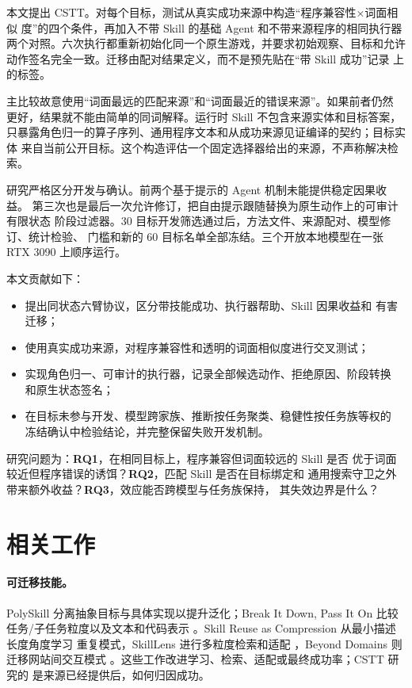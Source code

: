 \documentclass[10pt]{article}
\begin{document}
本文提出 CSTT。对每个目标，测试从真实成功来源中构造“程序兼容性×词面相似
度”的四个条件，再加入不带 Skill 的基础 Agent 和不带来源程序的相同执行器
两个对照。六次执行都重新初始化同一个原生游戏，并要求初始观察、目标和允许
动作签名完全一致。迁移由配对结果定义，而不是预先贴在“带 Skill 成功”记录
上的标签。

主比较故意使用“词面最远的匹配来源”和“词面最近的错误来源”。如果前者仍然
更好，结果就不能由简单的同词解释。运行时 Skill 不包含来源实体和目标答案，
只暴露角色归一的算子序列、通用程序文本和从成功来源见证编译的契约；目标实体
来自当前公开目标。这个构造评估一个固定选择器给出的来源，不声称解决检索。

研究严格区分开发与确认。前两个基于提示的 Agent 机制未能提供稳定因果收益。
第三次也是最后一次允许修订，把自由提示跟随替换为原生动作上的可审计有限状态
阶段过滤器。30 目标开发筛选通过后，方法文件、来源配对、模型修订、统计检验、
门槛和新的 60 目标名单全部冻结。三个开放本地模型在一张 RTX 3090 上顺序运行。

本文贡献如下：
\begin{itemize}
  \item 提出同状态六臂协议，区分带技能成功、执行器帮助、Skill 因果收益和
  有害迁移；
  \item 使用真实成功来源，对程序兼容性和透明的词面相似度进行交叉测试；
  \item 实现角色归一、可审计的执行器，记录全部候选动作、拒绝原因、阶段转换
  和原生状态签名；
  \item 在目标未参与开发、模型跨家族、推断按任务聚类、稳健性按任务族等权的
  冻结确认中检验结论，并完整保留失败开发机制。
\end{itemize}

研究问题为：\textbf{RQ1}，在相同目标上，程序兼容但词面较远的 Skill 是否
优于词面较近但程序错误的诱饵？\textbf{RQ2}，匹配 Skill 是否在目标绑定和
通用搜索守卫之外带来额外收益？\textbf{RQ3}，效应能否跨模型与任务族保持，
其失效边界是什么？

\section{相关工作}
\paragraph{可迁移技能。}
PolySkill 分离抽象目标与具体实现以提升泛化\citep{yu2026polyskill}；Break It
Down, Pass It On 比较任务/子任务粒度以及文本和代码表示
\citep{feng2026breakdown}。Skill Reuse as Compression 从最小描述长度角度学习
重复模式\citep{xu2026compression}，SkillLens 进行多粒度检索和适配
\citep{miao2026skilllens}，Beyond Domains 则迁移网站间交互模式
\citep{he2026beyond}。这些工作改进学习、检索、适配或最终成功率；CSTT 研究的
是来源已经提供后，如何归因成功。
\end{document}
